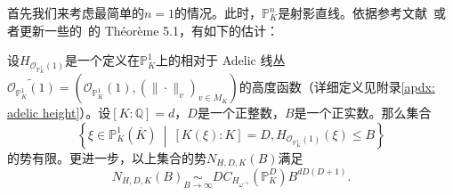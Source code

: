 首先我们来考虑最简单的$n=1$的情况。此时，$\mathbb P^n_K$是射影直线。依据参考文献~或者更新一些的~的 Th\'eor\`eme 5.1，有如下的估计：
\begin{theorem} 
设$H_{\mathcal{O}_{\mathbb{P}^1_K}(1)}$是一个定义在$\mathbb{P}^1_K$上的相对于 Adelic 线丛$\widetilde{\mathcal{O}_{\mathbb{P}^1_K}(1)} = (\mathcal{O}_{\mathbb{P}^1_K}(1), (\|\cdot\|_v)_{v \in M_K})$的高度函数（详细定义见附录\ref{apdx: adelic height}）。设$[K:\mathbb{Q}] = d$，$D$是一个正整数，$B$是一个正实数。那么集合
\begin{equation}
\left\{ \xi\in \mathbb{P}^1_K(\overline{K}) \ \middle|\ [K(\xi):K] = D, H_{\mathcal{O}_{\mathbb{P}^1_K}(1)}(\xi) \leqslant B \right\}
\end{equation}
的势有限。更进一步，以上集合的势$N_{H,D,K}(B)$满足
\begin{equation} \label{esimate of algebraic points on P1}
N_{H,D,K}(B) \underset{B\to\infty}{\sim} D C_{H_{\omega^{-1}}}(\mathbb{P}_K^D) B^{dD(D+1)}.
\end{equation}
\end{theorem}

